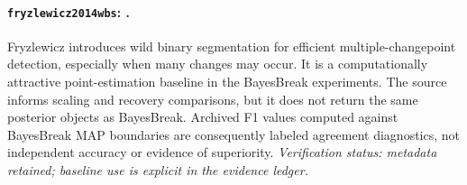 
\paragraph{\texttt{fryzlewicz2014wbs}: \citet{fryzlewicz2014wbs}.}
Fryzlewicz introduces wild binary segmentation for efficient multiple-changepoint detection, especially when many changes may occur. It is a computationally attractive point-estimation baseline in the BayesBreak experiments. The source informs scaling and recovery comparisons, but it does not return the same posterior objects as BayesBreak. Archived F1 values computed against BayesBreak MAP boundaries are consequently labeled agreement diagnostics, not independent accuracy or evidence of superiority. \textit{Verification status: metadata retained; baseline use is explicit in the evidence ledger.}
